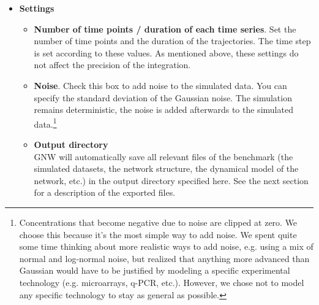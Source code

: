 \documentclass{llncs}
\newenvironment{mylist}{
\begin{itemize}
}{\end{itemize}}
\begin{document}
\begin{mylist}
\begin{itemize}
\item \textbf{Time series experiments}. Select the number of time series that you want to produce. The duration and number of time points of each time series can be set in the Settings below. The time series data shows how the networks recover from external perturbations. Trajectories are simulated by integrating the networks from a different randomly perturbed initial condition for every time series (only the initial conditions change, the network structure and parameters remain constant). The initial conditions are obtained by adding a random number from a normal distribution to the wild-type steady-state. The number of time points does not affect the precision of the numerical integration, this is just the number of time points that will be saved in the dataset.\\

\end{itemize}

\item \textbf{Settings}

\begin{itemize}

\item \textbf{Number of time points / duration of each time series}. Set the number of time points and the duration of the trajectories. The time step is set according to these values. As mentioned above, these settings do not affect the precision of the integration.\\

\item \textbf{Noise}. Check this box to add noise to the simulated data. You can specify the standard deviation of the Gaussian noise. The simulation remains deterministic, the noise is added afterwards to the simulated data.\footnote{Concentrations that become negative due to noise are clipped at zero. We choose this because it's the most simple way to add noise. We spent quite some time thinking about more realistic ways to add noise, e.g. using a mix of normal and log-normal noise, but realized that anything more advanced than Gaussian would have to be justified by modeling a specific experimental technology (e.g. microarrays, q-PCR, etc.). However, we chose not to model any specific technology to stay as general as possible.}\\

\item \textbf{Output directory}\\ GNW will automatically save all relevant files of the benchmark (the simulated datasets, the network structure, the dynamical model of the network, etc.) in the output directory specified here. See the next section for a description of the exported files.\\

\end{itemize}

\end{mylist}
\end{document}
